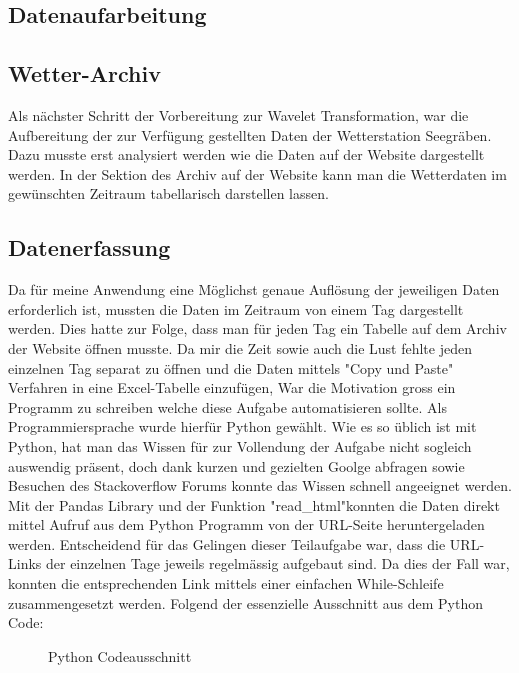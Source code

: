 \begin{refsection}
\section{Datenaufarbeitung}
\subsection{Wetter-Archiv}
Als n\"achster Schritt der Vorbereitung zur Wavelet Transformation, war die Aufbereitung der zur Verf\"ugung gestellten Daten der Wetterstation Seegr\"aben.
Dazu musste erst analysiert werden wie die Daten auf der Website dargestellt werden.
In der Sektion des Archiv auf der Website kann man die Wetterdaten im gew\"unschten Zeitraum tabellarisch darstellen lassen.
\subsection{Datenerfassung}
Da f\"ur meine Anwendung eine M\"oglichst genaue Aufl\"osung der jeweiligen Daten erforderlich ist, mussten die Daten im Zeitraum von einem Tag dargestellt werden. 
Dies hatte zur Folge, dass man f\"ur jeden Tag ein Tabelle auf dem Archiv der Website \"offnen musste. 
Da mir die Zeit sowie auch die Lust fehlte jeden einzelnen Tag separat zu \"offnen und die Daten mittels "Copy und Paste" Verfahren in eine Excel-Tabelle einzuf\"ugen, War die Motivation gross  ein Programm zu schreiben welche diese Aufgabe automatisieren sollte.
Als Programmiersprache wurde hierf\"ur Python gewählt.
Wie es so üblich ist mit Python, hat man das Wissen für zur Vollendung der Aufgabe nicht sogleich auswendig präsent, doch dank kurzen und gezielten Goolge abfragen sowie Besuchen des Stackoverflow Forums konnte das Wissen schnell angeeignet werden.
Mit der Pandas Library und der Funktion "read\_html"\space konnten die Daten direkt mittel Aufruf aus dem Python Programm von der URL-Seite heruntergeladen werden.
Entscheidend für das Gelingen dieser Teilaufgabe war, dass die URL-Links der einzelnen Tage jeweils regelmässig aufgebaut sind.
Da dies der Fall war, konnten die entsprechenden Link mittels einer einfachen While-Schleife zusammengesetzt werden.
\newpage
Folgend der essenzielle Ausschnitt aus dem Python Code:

\begin{figure}[h]
	\centering
	
	\caption{Python Codeausschnitt}
	\label{fig:python-code}
\end{figure}


\end{refsection}
